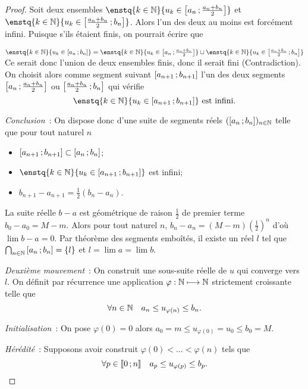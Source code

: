 \begin{proof}
Soit deux ensembles $\enstq{k \in \N}{u_k \in \intervalleff{a_n}{\frac{a_n+b_n}{2}}}$ et $\enstq{k \in \N}{u_k \in \intervalleff{\frac{a_n+b_n}{2}}{b_n}}$. Alors l'un des deux au moins est forcément infini. Puisque s'ils étaient finis, on pourrait écrire que

$\enstq{k \in \N}{u_k \in \intervalleff{a_n}{b_n}}= \enstq{k \in \N}{u_k \in \intervalleff{a_n}{\frac{a_n+b_n}{2}}} \cup \enstq{k \in \N}{u_k \in \intervalleff{\frac{a_n+b_n}{2}}{b_n}}$
Ce serait donc l'union de deux ensembles finis, donc il serait fini (Contradiction). On choisit alors comme segment suivant $\left[ a_{n+1} \, ;  b_{n+1} \right]$ l'un des deux segments $\left[ a_n \, ;  \frac{a_n+b_n}{2} \right]$ ou $\left[ \frac{a_n+b_n}{2} \, ;  b_n \right]$ qui vérifie
\begin{equation}
  \enstq{k \in \N}{u_k \in \intervalleff{a_{n+1}}{b_{n+1}}} \text{~est infini}.
\end{equation}

\emph{Conclusion}~: On dispose donc d'une suite de segments réels $(\left[ a_n \, ;  b_n \right])_{n \in \mathbb{N}}$ telle que pour tout naturel $n$
\begin{itemize}
\item $\left[ a_{n+1} \, ;  b_{n+1} \right] \subset \left[ a_{n} \, ;  b_{n} \right]$;
\item $\enstq{k \in \N}{u_k \in \intervalleff{a_{n+1}}{b_{n+1}}}$ est infini;
\item $b_{n+1}-a_{n+1}=\frac{1}{2}(b_n-a_n)$.
\end{itemize}

La suite réelle $b-a$ est géométrique de raison $\frac{1}{2}$ de premier terme $b_0-a_0=M-m$. Alors pour tout naturel $n$, $b_n-a_n=(M-m) \left(\frac{1}{2}\right)^n$ d'où $\lim b-a=0$. Par théorème des segments emboîtés, il existe un réel $l$ tel que $\bigcap_{n \in \mathbb{N}} \left[ a_{n} \, ;  b_{n} \right]=\{l\}$ et $l=\lim a = \lim b$.

\emph{Deuxième mouvement}~: On construit une sous-suite réelle de $u$ qui converge vers $l$. On définit par récurrence une application $\varphi : \mathbb{N} \longmapsto \mathbb{N}$ strictement croissante telle que
\begin{equation}
  \forall n \in \mathbb{N} \quad a_n \leq u_{\varphi(n)} \leq b_n.
\end{equation}

\emph{Initialisation}~: On pose $\varphi(0)=0$ alors $a_0=m \leq u_{\varphi(0)}=u_{0} \leq b_0=M$.

\emph{Hérédité}~: Supposons avoir construit $\varphi(0) < \ldots < \varphi(n)$ tels que
\begin{equation}
  \forall p \in \mathopen{\llbracket}0\mathclose{}\mathpunct{};n\mathclose{\rrbracket} \quad a_p \leq u_{\varphi(p)} \leq b_p.
\end{equation}


\end{proof}
